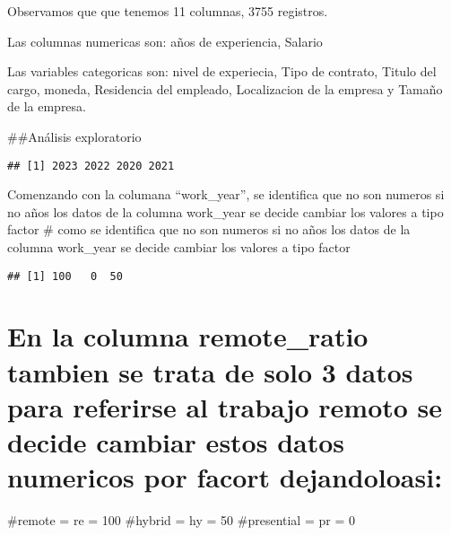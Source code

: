 \documentclass[
]{article}
\begin{document}
Observamos que que tenemos 11 columnas, 3755 registros.

Las columnas numericas son: años de experiencia, Salario

Las variables categoricas son: nivel de experiecia, Tipo de contrato,
Titulo del cargo, moneda, Residencia del empleado, Localizacion de la
empresa y Tamaño de la empresa.

\#\#Análisis exploratorio

\begin{verbatim}
## [1] 2023 2022 2020 2021
\end{verbatim}

Comenzando con la columana ``work\_year'', se identifica que no son
numeros si no años los datos de la columna work\_year se decide cambiar
los valores a tipo factor \# como se identifica que no son numeros si no
años los datos de la columna work\_year se decide cambiar los valores a
tipo factor

\begin{verbatim}
## [1] 100   0  50
\end{verbatim}

\hypertarget{en-la-columna-remote_ratio-tambien-se-trata-de-solo-3-datos-para-referirse-al-trabajo-remoto-se-decide-cambiar-estos-datos-numericos-por-facort-dejandoloasi}{%
\section{En la columna remote\_ratio tambien se trata de solo 3 datos
para referirse al trabajo remoto se decide cambiar estos datos numericos
por facort
dejandoloasi:}\label{en-la-columna-remote_ratio-tambien-se-trata-de-solo-3-datos-para-referirse-al-trabajo-remoto-se-decide-cambiar-estos-datos-numericos-por-facort-dejandoloasi}}

\#remote = re = 100 \#hybrid = hy = 50 \#presential = pr = 0
\end{document}
